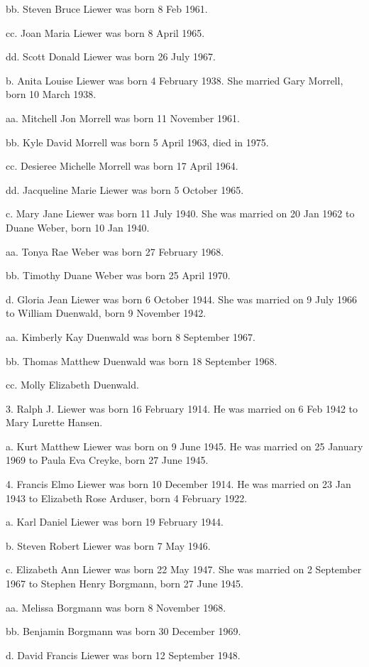 \documentclass[a4paper]{article}
\begin{document}
bb. Steven Bruce Liewer was born 8 Feb 1961.

cc. Joan Maria Liewer was born 8 April 1965.

dd. Scott Donald Liewer was born 26 July 1967.

b. Anita Louise Liewer was born 4 February 1938.  She married Gary Morrell, born 10 March 1938.

aa. Mitchell Jon Morrell was born 11 November 1961.

bb. Kyle David Morrell was born 5 April 1963, died in 1975.

cc. Desieree Michelle Morrell was born 17 April 1964.

dd. Jacqueline Marie Liewer was born 5 October 1965.

c. Mary Jane Liewer was born 11 July 1940.  She was married on 20 Jan 1962 to Duane Weber, born 10 Jan 1940.

aa. Tonya Rae Weber was born 27 February 1968.

bb. Timothy Duane Weber was born 25 April 1970.

d. Gloria Jean Liewer was born 6 October 1944.  She was married on 9 July 1966 to William Duenwald, born 9 November 1942.

aa. Kimberly Kay Duenwald was born 8 September 1967.

bb. Thomas Matthew Duenwald was born 18 September 1968.

cc. Molly Elizabeth Duenwald.

3. Ralph J. Liewer was born 16 February 1914.  He was married on 6 Feb 1942 to Mary Lurette Hansen.

a. Kurt Matthew Liewer was born on 9 June 1945.  He was married on 25 January 1969 to Paula Eva Creyke, born 27 June 1945.

4. Francis Elmo Liewer was born 10 December 1914.  He was married on 23 Jan 1943 to Elizabeth Rose Arduser, born 4 February 1922.

a. Karl Daniel Liewer was born 19 February 1944.

b. Steven Robert Liewer was born 7 May 1946.

c. Elizabeth Ann Liewer was born 22 May 1947.  She was married on 2 September 1967 to Stephen Henry Borgmann, born 27 June 1945.

aa. Melissa Borgmann was born 8 November 1968.

bb. Benjamin Borgmann was born 30 December 1969.

d. David Francis Liewer was born 12 September 1948.
\end{document}
